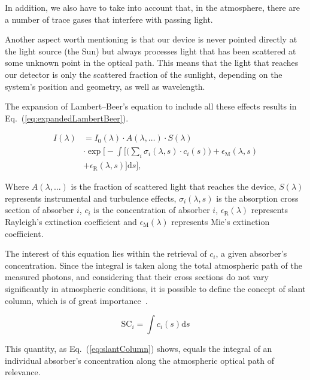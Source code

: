 In addition, we also have to take into account that, in the atmosphere,
there are a number of trace gases that interfere with passing light.

Another aspect worth mentioning is that our device is never pointed
directly at the light source (the Sun) but always processes light that
has been scattered at some unknown point in the optical path. This means
that the light that reaches our detector is only the scattered fraction
of the sunlight, depending on the system's position and geometry, as
well as wavelength.

The expansion of Lambert--Beer's equation to include all these effects
results in Eq.~(\ref{eq:expandedLambertBeer}).

\begin{align}
      \label{eq:expandedLambertBeer}
I(\lambda) & = I_{0}(\lambda) \cdot A(\lambda, \ldots) \cdot S(\lambda) \nonumber \\
      &\cdot
      \exp \Bigg[ - \int \Big[ \Big(\sum_{i} \sigma_{i}(\lambda, s) \cdot c_{i}(s)\Big) +
      \epsilon_\mathrm{M}(\lambda, s)\nonumber\\
      & + \epsilon_\mathrm{R}(\lambda, s) \Big]\mathrm{d}s \Bigg],
\end{align}

Where $A(\lambda, \ldots)$ is the fraction of scattered light that
reaches the device, $S(\lambda)$ represents instrumental and turbulence
effects, $\sigma_{i}(\lambda, s)$ is the absorption cross section of
absorber $i$, $c_{i}$ is the concentration of absorber $i$,
$\epsilon_\mathrm{R}(\lambda)$ represents Rayleigh's extinction
coefficient and $\epsilon_\mathrm{M}(\lambda)$ represents Mie's
extinction coefficient.


The interest of this equation lies within the retrieval of $c_i$, a
given absorber's concentration. Since the integral is taken along the
total atmospheric path of the measured photons, and considering that
their cross sections do not vary significantly in atmospheric
conditions, it is possible to define the concept of slant column, which
is of great importance~\cite{Merlaud2013}.

\begin{equation}
      \label{eq:slantColumn}
      \mathrm{SC}_{i} = \int c_{i}(s)\mathrm{d}s
\end{equation}

This quantity, as Eq.~(\ref{eq:slantColumn}) shows, equals the integral
of an individual absorber's concentration along the atmospheric optical
path of relevance.

